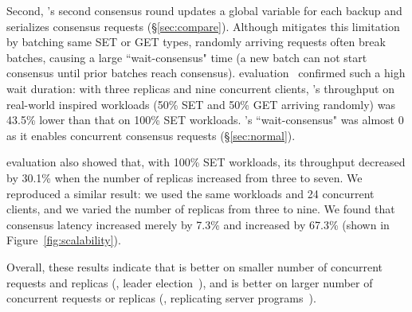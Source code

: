 Second, \dare's second consensus round updates a global variable for each 
backup and serializes consensus requests (\S\ref{sec:compare}). 
Although \dare mitigates this limitation by batching same SET or GET types, 
randomly arriving requests often break batches, causing a large 
``wait-consensus" time (a new batch can not start consensus until prior batches 
reach consensus). \dare evaluation~\cite{dare:hpdc15} confirmed such a high 
wait duration: with three replicas and nine concurrent clients, \dare's 
throughput on real-world inspired workloads (50\% SET and 50\% GET arriving 
randomly) was 43.5\% lower than that on 100\% SET workloads. \xxx's 
``wait-consensus" was almost 0 as it enables concurrent consensus requests 
(\S\ref{sec:normal}).

\dare evaluation also showed that, with 100\% SET workloads, its throughput 
decreased by 30.1\% when the number of replicas increased from three to seven. 
We reproduced a similar result: we used the same workloads and 24 concurrent 
clients, and we varied the number of replicas from three to nine. We found 
that \xxx consensus latency increased merely by 7.3\% and \dare increased by 
67.3\% (shown in Figure~\ref{fig:scalability}).

Overall, these results indicate that \dare is better on smaller number of 
concurrent requests and replicas (\eg, 
leader election~\cite{chubby:osdi,zookeeper}), and \xxx is better on larger 
number of concurrent requests or replicas (\eg, replicating server 
programs~\cite{rex:eurosys14,crane:sosp15}).


% 

